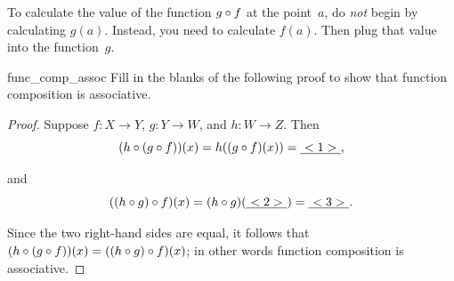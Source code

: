 \begin{warn} \label{ComposeWarn}
To calculate the value of the function $g \circ f$ at the point~$a$, do \emph{not} begin by calculating $g(a)$. Instead, you need to calculate $f(a)$. Then plug that value into the function~$g$.
\end{warn}

\begin{exercise}{func_comp_assoc}
Fill in the blanks of the following proof to show that function composition is associative.

\begin{proof}
Suppose $f: X \to Y$, $g: Y \to W$, and $h: W \to Z$. 
Then 
\[
(h \circ (g \circ f))(x) = h((g \circ f)(x)) =\underline{~<1>~},\]

\noindent
and
\[ ((h \circ g) \circ f)(x) = (h \circ g)(\underline{~<2>~}) =  \underline{~<3>~}. \]

\noindent
Since the two right-hand sides are equal, it follows that $(h \circ (g \circ f))(x) = ((h \circ g) \circ f)(x)$; in other words function composition is associative.
\end{proof}
\end{exercise}

